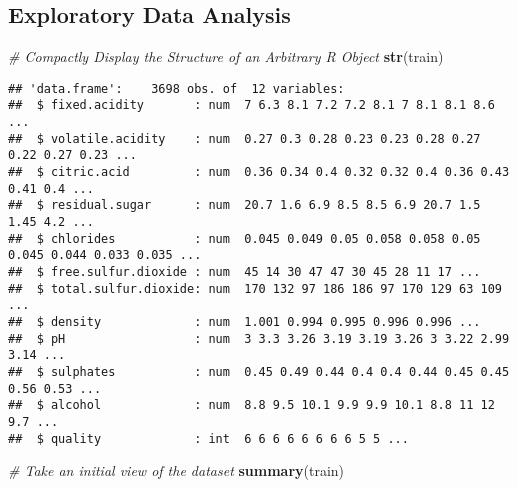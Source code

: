 \documentclass[
]{article}
\newenvironment{Shaded}{\begin{snugshade}}{\end{snugshade}}
\newcommand{\CommentTok}[1]{\textcolor[rgb]{0.56,0.35,0.01}{\textit{#1}}}
\newcommand{\FunctionTok}[1]{\textcolor[rgb]{0.13,0.29,0.53}{\textbf{#1}}}
\newcommand{\NormalTok}[1]{#1}
\begin{document}
\hypertarget{exploratory-data-analysis}{%
\subsection{Exploratory Data Analysis}\label{exploratory-data-analysis}}

\begin{Shaded}
\begin{Highlighting}[]
\CommentTok{\# Compactly Display the Structure of an Arbitrary R Object}
\FunctionTok{str}\NormalTok{(train)}
\end{Highlighting}
\end{Shaded}

\begin{verbatim}
## 'data.frame':    3698 obs. of  12 variables:
##  $ fixed.acidity       : num  7 6.3 8.1 7.2 7.2 8.1 7 8.1 8.1 8.6 ...
##  $ volatile.acidity    : num  0.27 0.3 0.28 0.23 0.23 0.28 0.27 0.22 0.27 0.23 ...
##  $ citric.acid         : num  0.36 0.34 0.4 0.32 0.32 0.4 0.36 0.43 0.41 0.4 ...
##  $ residual.sugar      : num  20.7 1.6 6.9 8.5 8.5 6.9 20.7 1.5 1.45 4.2 ...
##  $ chlorides           : num  0.045 0.049 0.05 0.058 0.058 0.05 0.045 0.044 0.033 0.035 ...
##  $ free.sulfur.dioxide : num  45 14 30 47 47 30 45 28 11 17 ...
##  $ total.sulfur.dioxide: num  170 132 97 186 186 97 170 129 63 109 ...
##  $ density             : num  1.001 0.994 0.995 0.996 0.996 ...
##  $ pH                  : num  3 3.3 3.26 3.19 3.19 3.26 3 3.22 2.99 3.14 ...
##  $ sulphates           : num  0.45 0.49 0.44 0.4 0.4 0.44 0.45 0.45 0.56 0.53 ...
##  $ alcohol             : num  8.8 9.5 10.1 9.9 9.9 10.1 8.8 11 12 9.7 ...
##  $ quality             : int  6 6 6 6 6 6 6 6 5 5 ...
\end{verbatim}

\begin{Shaded}
\begin{Highlighting}[]
\CommentTok{\# Take an initial view of the dataset}
\FunctionTok{summary}\NormalTok{(train)}
\end{Highlighting}
\end{Shaded}
\end{document}

